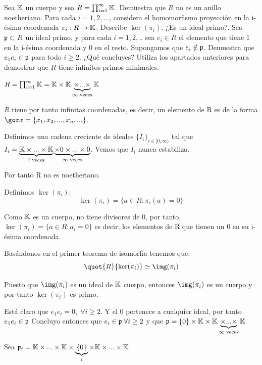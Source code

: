 \begin{problem}[2]
	Sea $\mathbb{K}$ un cuerpo y sea $R=\prod_{i=1}^{\infty} \mathbb{K}$.
	\ppart Demuestra que $R$ no es un anillo noetheriano.
	\ppart Para cada $i=1,2,...$, considera el homomorfismo proyección en la i-ésima coordenada $\pi_i:R \rightarrow \mathbb{K}$. Describe $\ker(\pi_i)$. ¿Es un ideal primo?.
	\ppart Sea $\mathfrak{p} \subset R$ un ideal primo, y para cada $i=1,2,..$ sea $e_i \in R$ el elemento que tiene 1 en la i-ésima coordenada y 0 en el resto. Supongamos que $e_i \notin \mathfrak{p}$. Demuestra que $e_1e_i \in \mathfrak{p}$ para todo $i \geq 2$. ¿Qué concluyes?
	\ppart Utiliza los apartados anteriores para demostrar que $R$ tiene infinitos primos minimales.

	\solution

	\spart
	$R=  \prod_{i=1}^{\infty} \mathbb{K} = \mathbb{K} \times \mathbb{K} \underbrace{\times... \times}_{\infty \text{ veces}} \mathbb{K}$

	$R$ tiene por tanto infinitas coordenadas, es decir, un elemento de R es de la forma $\cls{x}=\{x_1,x_2,...,x_n,...\}$.

	Definimos una cadena creciente de ideales $\{I_i\}_{i \in [0,\infty)}$ tal que $I_i = \underbrace{\mathbb{K} \times... \times \mathbb{K}}_{i\text{ veces}} \underbrace{\times 0 \times ...  \times 0}_{\infty \text{ veces}}$. Vemos que $I_i$ nunca estabiliza.

	Por tanto R no es noetheriano.


	\spart

	Definimos $\ker(\pi_i)$:
	$$ \ker(\pi_i)=\{ a \in R: \pi_i(a)=0 \} $$

	Como $\mathbb{K}$ es un cuerpo, no tiene divisores de 0, por tanto, $\ker(\pi_i) = \{ a \in R: a_i=0 \}$ es decir, los elementos de R que tienen un 0 en su i-ésima coordenada.

	Basándonos en el primer teorema de isomorfía tenemos que:
	$$\quot{R}{\ker(\pi_i)} \simeq \img(\pi_i)$$


	Puesto que  $\img(\pi_i)$ es un ideal de $\mathbb{K}$ cuerpo, entonces $\img(\pi_i)$ es un cuerpo y por tanto $\ker(\pi_i)$ es primo.

	\spart

	Está claro que $e_1e_i = 0, \; \forall i \geq 2$. Y el 0 pertenece a cualquier ideal, por tanto $e_1e_i \in \mathfrak{p}$ Concluyo entonces que $e_i \in \mathfrak{p} \; \forall i \geq 2$ y que $\mathfrak{p} = \{0\} \times \mathbb{K} \times \mathbb{K} \underbrace{\times... \times}_{\infty \text{ veces}} \mathbb{K}$

	\spart

	Sea $\mathfrak{p}_i =  \mathbb{K} \times ... \times \mathbb{K} \times \underbrace{\{0\}}_{i} \times \mathbb{K} \times ... \times \mathbb{K}$


\end{problem}
